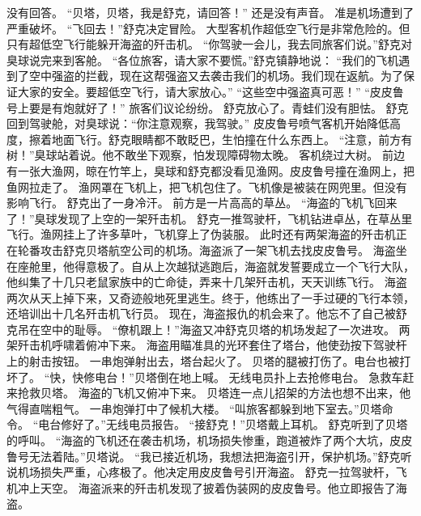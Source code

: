 \documentclass[a4paper,12pt,UTF8,twoside]{ctexbook}
\begin{document}
        没有回答。 
        “贝塔，贝塔，我是舒克，请回答！” 
        还是没有声音。 
        准是机场遭到了严重破坏。 
        “飞回去！”舒克决定冒险。 
        大型客机作超低空飞行是非常危险的。但只有超低空飞行能躲开海盗的歼击机。 
        “你驾驶一会儿，我去同旅客们说。”舒克对臭球说完来到客舱。 
        “各位旅客，请大家不要慌。”舒克镇静地说： 
        “我们的飞机遇到了空中强盗的拦截，现在这帮强盗又去袭击我们的机场。我们现在返航。为了保证大家的安全。要超低空飞行，请大家放心。” 
        “这些空中强盗真可恶！” 
        “皮皮鲁号上要是有炮就好了！” 
        旅客们议论纷纷。 
        舒克放心了。青蛙们没有胆怯。 
        舒克回到驾驶舱，对臭球说：“你注意观察，我驾驶。” 
        皮皮鲁号喷气客机开始降低高度，擦着地面飞行。舒克眼睛都不敢眨巴，生怕撞在什么东西上。 
        “注意，前方有树！”臭球站着说。他不敢坐下观察，怕发现障碍物太晚。 
        客机绕过大树。 
        前边有一张大渔网，晾在竹竿上，臭球和舒克都没看见渔网。皮皮鲁号撞在渔网上，把鱼网拉走了。 
        渔网罩在飞机上，把飞机包住了。飞机像是被装在网兜里。但没有影响飞行。 
        舒克出了一身冷汗。 
        前方是一片高高的草丛。 
        “海盗的飞机飞回来了！”臭球发现了上空的一架歼击机。 
        舒克一推驾驶杆，飞机钻进卓丛，在草丛里飞行。渔网挂上了许多草叶，飞机穿上了伪装服。 
        此时还有两架海盗的歼击机正在轮番攻击舒克贝塔航空公司的机场。海盗派了一架飞机去找皮皮鲁号。 
        海盗坐在座舱里，他得意极了。自从上次越狱逃跑后，海盗就发誓要成立一个飞行大队，他纠集了十几只老鼠家族中的亡命徒，弄来十几架歼击机，天天训练飞行。 
        海盗两次从天上掉下来，又奇迹般地死里逃生。终于，他练出了一手过硬的飞行本领，还培训出十几名歼击机飞行员。 
        现在，海盗报仇的机会来了。他忘不了自己被舒克吊在空中的耻辱。 
        “僚机跟上！”海盗又冲舒克贝塔的机场发起了一次进攻。 
        两架歼击机呼啸着俯冲下来。 
        海盗用瞄准具的光环套住了塔台，他使劲按下驾驶杆上的射击按钮。 
        一串炮弹射出去，塔台起火了。 
        贝塔的腿被打伤了。电台也被打坏了。 
        “快，快修电台！”贝塔倒在地上喊。 
        无线电员扑上去抢修电台。 
        急救车赶来抢救贝塔。 
        海盗的飞机又俯冲下来。 
        贝塔连一点儿招架的方法也想不出来，他气得直喘粗气。 
        一串炮弹打中了候机大楼。 
        “叫旅客都躲到地下室去。”贝塔命令。 
        “电台修好了。”无线电员报告。 
        “接舒克！”贝塔戴上耳机。 
        舒克听到了贝塔的呼叫。 
        “海盗的飞机还在袭击机场，机场损失惨重，跑道被炸了两个大坑，皮皮鲁号无法着陆。”贝塔说。 
        “我已接近机场，我想法把海盗引开，保护机场。”舒克听说机场损失严重，心疼极了。他决定用皮皮鲁号引开海盗。 
        舒克一拉驾驶杆，飞机冲上天空。 
        海盗派来的歼击机发现了披着伪装网的皮皮鲁号。他立即报告了海盗。 
\end{document}

